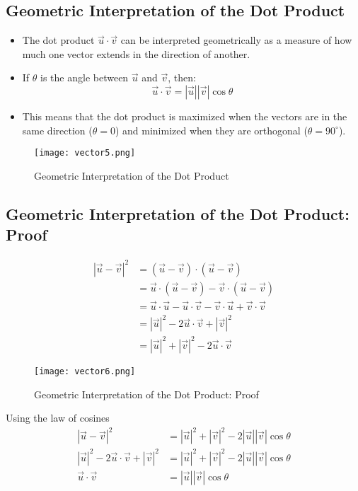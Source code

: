 \subsection{Geometric Interpretation of the Dot Product}
\begin{itemize}
    \item The dot product \(\vec{u} \cdot \vec{v}\) can be interpreted geometrically as a measure of how much one vector extends in the direction of another.
    \item If \(\theta\) is the angle between \(\vec{u}\) and \(\vec{v}\), then:
    \[ \vec{u} \cdot \vec{v} = |\vec{u}||\vec{v}|\cos\theta \]
    \item This means that the dot product is maximized when the vectors are in the same direction (\(\theta = 0\)) and minimized when they are orthogonal (\(\theta = 90^\circ\)).
\end{itemize}
\begin{figure}
    \centering
    \texttt{[image: vector5.png]}
    \caption{Geometric Interpretation of the Dot Product}
    \label{fig:dot_product}
\end{figure}

\subsection{Geometric Interpretation of the Dot Product: Proof}
\begin{align*}
    | \vec{u} - \vec{v}|^2 &= (\vec{u} - \vec{v}) \cdot (\vec{u} - \vec{v}) \\
    &= \vec{u} \cdot (\vec{u} - \vec{v} ) - \vec{v} \cdot (\vec{u} - \vec{v}) \\
    &= \vec{u} \cdot \vec{u} - \vec{u} \cdot \vec{v} - \vec{v} \cdot \vec{u} + \vec{v} \cdot \vec{v} \\
    &= |\vec{u}|^2 - 2\vec{u} \cdot \vec{v} + |\vec{v}|^2 \\
    &= |\vec{u}|^2 + |\vec{v}|^2 - 2\vec{u} \cdot \vec{v}
\end{align*}
\begin{figure}
    \centering
    \texttt{[image: vector6.png]}
    \caption{Geometric Interpretation of the Dot Product: Proof}
    \label{fig:dot_product_proof}
\end{figure}
Using the law of cosines
\begin{align*}
    |\vec{u} - \vec{v}|^2 &= |\vec{u}|^2 + |\vec{v}|^2 - 2|\vec{u}||\vec{v}|\cos\theta \\
    |\vec{u}|^2 - 2\vec{u} \cdot \vec{v} + |\vec{v}|^2 &= |\vec{u}|^2 + |\vec{v}|^2 - 2|\vec{u}||\vec{v}|\cos\theta \\
    \vec{u} \cdot \vec{v} &= |\vec{u}||\vec{v}|\cos\theta
\end{align*}

